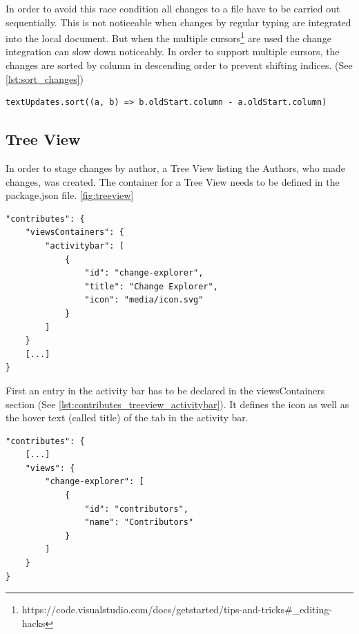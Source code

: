 In order to avoid this race condition all changes to a file have to be carried out sequentially. This is not noticeable when changes by regular typing are integrated into the local document. But when the multiple cursors\footnote{https://code.visualstudio.com/docs/getstarted/tips-and-tricks\#\_editing-hacks} are used the change integration can slow down noticeably. In order to support multiple cursors, the changes are sorted by column in descending order to prevent shifting indices. (See \autoref{lst:sort_changes})
\begin{lstlisting}[label={lst:sort_changes}, caption=Sorting Changes by Column to Prevent Index Shifting]
textUpdates.sort((a, b) => b.oldStart.column - a.oldStart.column)
\end{lstlisting}

\subsection{Tree View}

In order to stage changes by author, a Tree View listing the Authors, who made changes, was created.
The container for a Tree View needs to be defined in the package.json file. \autoref{fig:treeview}

\begin{minipage}{\linewidth}
\begin{lstlisting}[label={lst:contributes_treeview_activitybar}, caption=Tree View Activitybar]
"contributes": {
    "viewsContainers": {
        "activitybar": [
            {
                "id": "change-explorer",
                "title": "Change Explorer",
                "icon": "media/icon.svg"
            }
        ]
    }
    [...]
}
\end{lstlisting}
\end{minipage}

First an entry in the activity bar has to be declared in the viewsContainers section (See \autoref{lst:contributes_treeview_activitybar}). It defines the icon as well as the hover text (called title) of the tab in the activity bar.

\begin{lstlisting}[label={lst:contributes_treeview_view}, caption=Tree View Panel Definition]
"contributes": {
    [...]
    "views": {
        "change-explorer": [
            {
                "id": "contributors",
                "name": "Contributors"
            }
        ]
    }
}
\end{lstlisting}

